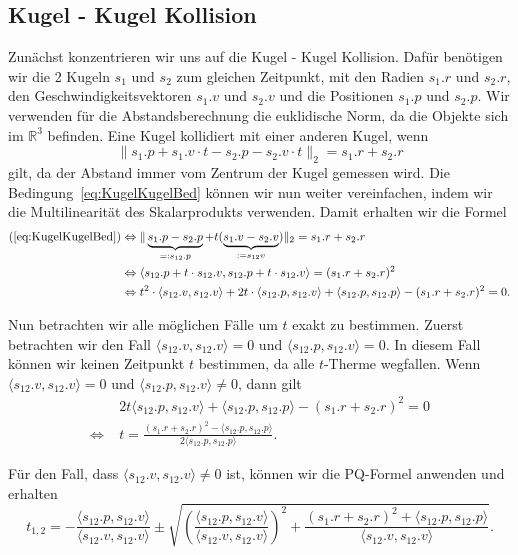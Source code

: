 \documentclass[a4paper, 10pt, openright, parskip, chapterprefix]{scrreprt}
\begin{document}
\subsection{Kugel - Kugel Kollision}
\noindent Zunächst konzentrieren wir uns auf die Kugel - Kugel Kollision. Dafür benötigen wir die 2 Kugeln 
$s_1$ und $s_2$ zum gleichen Zeitpunkt, mit den Radien $s_1.r$ und $s_2.r$, den Geschwindigkeitsvektoren
$s_1.v$ und $s_2.v$ und die Positionen $s_1.p$ und $s_2.p$. Wir verwenden für die Abstandsberechnung die
euklidische Norm, da die Objekte sich im $\mathbb{R}^{3}$ befinden. Eine Kugel kollidiert mit einer anderen
Kugel, wenn 
\begin{equation}
    \label{eq:KugelKugelBed}
    \|s_1.p + s_1.v \cdot t - s_2.p - s_2.v \cdot t \|_{2} = s_1.r + s_2.r
\end{equation}
gilt, da der Abstand immer vom Zentrum der Kugel gemessen wird.
Die Bedingung~\ref{eq:KugelKugelBed} können wir nun weiter vereinfachen, indem wir die Multilinearität des Skalarprodukts verwenden. Damit erhalten wir die Formel 
\begin{align*}
(\ref{eq:KugelKugelBed})  &\Leftrightarrow \|\underbrace{s_1.p - s_2.p}_{=: s_{12}.p} + t (\underbrace{s_1.v - s_2.v}_{:=s_{12}v})\|_{2}  = s_1.r + s_2.r\\
&\Leftrightarrow \langle s_{12}.p + t \cdot s_{12}.v, s_{12}.p + t \cdot s_{12}.v\rangle = (s_1.r + s_2.r)^{2}\\
&\Leftrightarrow t^{2} \cdot \langle s_{12}.v, s_{12}.v\rangle + 2t \cdot \langle s_{12}.p, s_{12}.v\rangle + \langle s_{12}.p, s_{12}.p\rangle -(s_1.r+s_2.r)^{2} = 0 \text{.}
\end{align*}

\noindent Nun betrachten wir alle möglichen Fälle um $t$ exakt zu bestimmen. Zuerst betrachten wir den Fall $\langle s_{12}.v, s_{12}.v \rangle = 0$ und $\langle s_{12}.p, s_{12}.v \rangle = 0$. In diesem Fall können wir keinen Zeitpunkt $t$ bestimmen, da alle $t$-Therme wegfallen. Wenn
$\langle s_{12}.v, s_{12}.v \rangle = 0$ und $\langle s_{12}.p, s_{12}.v\rangle \not= 0$, dann gilt
\begin{align*}
&2t \langle s_{12}.p, s_{12}.v\rangle + \langle s_{12}.p, s_{12}.p \rangle - (s_{1}.r + s_{2}.r)^{2} = 0 \\
\Leftrightarrow \; &t  = \frac{(s_{1}.r + s_{2}.r)^{2} - \langle s_{12}.p, s_{12}.p \rangle}{2 \langle s_{12}.p, s_{12}.p\rangle}\text{.}
\end{align*}

\noindent  Für den Fall, dass $\langle s_{12}.v, s_{12}.v \rangle \not= 0$ ist, können wir die PQ-Formel anwenden und erhalten
\begin{equation*}
t_{1, 2} = -\frac{\langle s_{12}.p, s_{12}.v\rangle}{\langle s_{12}.v, s_{12}.v \rangle} \pm \sqrt{ \left( \frac{\langle s_{12}.p, s_{12}.v\rangle}{\langle s_{12}.v, s_{12}.v \rangle} \right)^{2} + \frac{(s_{1}.r + s_{2}.r)^{2} + \langle s_{12}.p, s_{12}.p\rangle}{\langle s_{12}.v, s_{12}.v \rangle}}\text{.}
\end{equation*}
\end{document}
